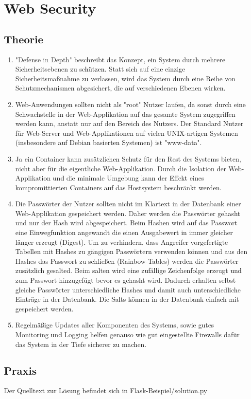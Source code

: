 \documentclass[ngerman]{article}
\begin{document}
\section{Web Security}

\subsection{Theorie}
\begin{enumerate}
    \item "Defense in Depth" beschreibt das Konzept, ein System durch mehrere Sicherheitsebenen zu schützen. Statt sich auf eine einzige Sicherheitsmaßnahme zu verlassen, wird das System durch eine Reihe von Schutzmechanismen abgesichert, die auf verschiedenen Ebenen wirken.
    
    \item Web-Anwendungen sollten nicht als "root" Nutzer laufen, da sonst durch eine Schwachstelle in der Web-Applikation auf das gesamte System zugegriffen werden kann, anstatt nur auf den Bereich des Nutzers. Der Standard Nutzer für Web-Server und Web-Applikationen auf vielen UNIX-artigen Systemen (insbesondere auf Debian basierten Systemen) ist "www-data".
    
    \item Ja ein Container kann zusätzlichen Schutz für den Rest des Systems bieten, nicht aber für die eigentliche Web-Applikation. Durch die Isolation der Web-Applikation und die minimale Umgebung kann der Effekt eines kompromittierten Containers auf das Hostsystem beschränkt werden.
    
    \item Die Passwörter der Nutzer sollten nicht im Klartext in der Datenbank einer Web-Applikation gespeichert werden. Daher werden die Passwörter gehasht und nur der Hash wird abgespeichert. Beim Hashen wird auf das Passwort eine Einwegfunktion angewandt die einen Ausgabewert in immer gleicher länger erzeugt (Digest). Um zu verhindern, dass Angreifer vorgefertigte Tabellen mit Hashes zu gängigen Passwörtern verwenden können und aus den Hashes das Passwort zu schließen (Rainbow-Tables) werden die Passwörter zusätzlich gesalted. Beim salten wird eine zufällige Zeichenfolge erzeugt und zum Passwort hinzugefügt bevor es gehasht wird. Dadurch erhalten selbst gleiche Passwörter unterschiedliche Hashes und damit auch unterschiedliche Einträge in der Datenbank. Die Salts können in der Datenbank einfach mit gespeichert werden.

    \item Regelmäßige Updates aller Komponenten des Systems, sowie gutes Monitoring und Logging helfen genauso wie gut eingestellte Firewalls dafür das System in der Tiefe sicherer zu machen.
    
\end{enumerate}

\subsection{Praxis}

Der Quelltext zur Lösung befindet sich in Flask-Beispiel/solution.py
\end{document}
